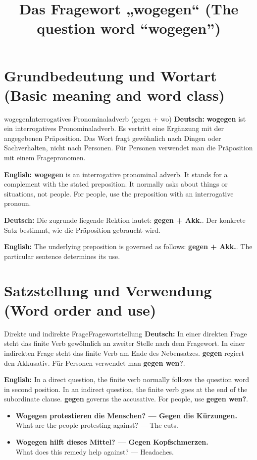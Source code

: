 \documentclass[a4paper,11pt]{article}
\title{Das Fragewort „wogegen“ (The question word “wogegen”)}
\date{}
\newcommand{\GermanText}[1]{\textbf{Deutsch: }#1\par}
\newcommand{\EnglishText}[1]{{\small\color{SoftGray}\textbf{English: }#1\par}}
\newcommand{\ExampleItem}[2]{\item \textbf{#1}\\{\small\color{SoftGray}#2}}
\begin{document}
\maketitle
\tableofcontents
\newpage
\section{Grundbedeutung und Wortart (Basic meaning and word class)}
\begin{grammarentry}{wogegen}{Interrogatives Pronominaladverb (gegen + wo)}
\GermanText{\textbf{wogegen} ist ein interrogatives Pronominaladverb. Es vertritt eine Ergänzung mit der angegebenen Präposition. Das Wort fragt gewöhnlich nach Dingen oder Sachverhalten, nicht nach Personen. Für Personen verwendet man die Präposition mit einem Fragepronomen.}
\EnglishText{\textbf{wogegen} is an interrogative pronominal adverb. It stands for a complement with the stated preposition. It normally asks about things or situations, not people. For people, use the preposition with an interrogative pronoun.}
\GermanText{Die zugrunde liegende Rektion lautet: \textbf{gegen + Akk.}. Der konkrete Satz bestimmt, wie die Präposition gebraucht wird.}
\EnglishText{The underlying preposition is governed as follows: \textbf{gegen + Akk.}. The particular sentence determines its use.}
\end{grammarentry}
\section{Satzstellung und Verwendung (Word order and use)}
\begin{grammarentry}{Direkte und indirekte Frage}{Fragewortstellung}
\GermanText{In einer direkten Frage steht das finite Verb gewöhnlich an zweiter Stelle nach dem Fragewort. In einer indirekten Frage steht das finite Verb am Ende des Nebensatzes. \textbf{gegen} regiert den Akkusativ. Für Personen verwendet man \textbf{gegen wen?}.}
\EnglishText{In a direct question, the finite verb normally follows the question word in second position. In an indirect question, the finite verb goes at the end of the subordinate clause. \textbf{gegen} governs the accusative. For people, use \textbf{gegen wen?}.}
\end{grammarentry}
\begin{exbox}\begin{itemize}
\ExampleItem{Wogegen protestieren die Menschen? — Gegen die Kürzungen.}{What are the people protesting against? — The cuts.}
\ExampleItem{Wogegen hilft dieses Mittel? — Gegen Kopfschmerzen.}{What does this remedy help against? — Headaches.}
\end{itemize}\end{exbox}
\end{document}
